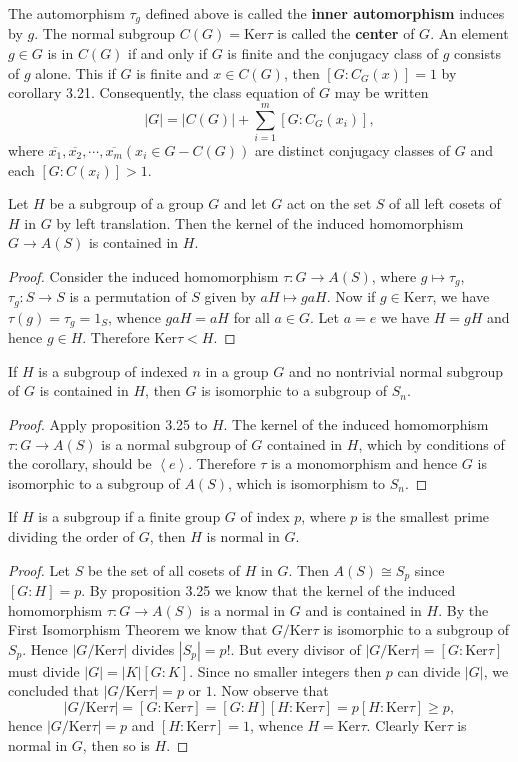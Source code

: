 The automorphism $\tau_g$ defined above is called the \textbf{inner automorphism} induces by $g$. The normal subgroup $C(G)=\mathrm{Ker}\tau$ is called the \textbf{center} of $G$. An element $g\in G$ is in $C(G)$ if and only if $G$ is finite and the conjugacy class of $g$ consists of $g$ alone. This if $G$ is finite and $x\in C(G)$, then $[G:C_G(x)]=1$ by corollary 3.21. Consequently, the class equation of $G$ may be written 
$$|G|=|C(G)|+\sum_{i=1}^m[G:C_G(x_i)],$$
where $\overline{x_1},\overline{x_2},\cdots,\overline{x_m}(x_i\in G-C(G))$ are distinct conjugacy classes of $G$ and each $[G:C(x_i)]>1$.
\begin{proposition}
Let $H$ be a subgroup of a group $G$ and let $G$ act on the set $S$ of all left cosets of $H$ in $G$ by left translation. Then the kernel of the induced homomorphism $G\to A(S)$ is contained in $H$.
\end{proposition}
\begin{proof}
Consider the induced homomorphism $\tau:G\to A(S)$, where $g\mapsto\tau_g$, $\tau_g:S\to S$ is a permutation of $S$ given by $aH\mapsto gaH$. Now if $g\in\mathrm{Ker}\tau$, we have $\tau(g)=\tau_g=1_S$, whence $gaH=aH$ for all $a\in G$. Let $a=e$ we have $H=gH$ and hence $g\in H$. Therefore $\mathrm{Ker}\tau<H$.
\end{proof}
\begin{corollary}
If $H$ is a subgroup of indexed $n$ in a group $G$ and no nontrivial normal subgroup of $G$ is contained in $H$, then $G$ is isomorphic to a subgroup of $S_n$.
\end{corollary}
\begin{proof}
Apply proposition 3.25 to $H$. The kernel of the induced homomorphism $\tau:G\to A(S)$ is a normal subgroup of $G$ contained in $H$, which by conditions of the corollary, should be $\left<e\right>$. Therefore $\tau$ is a monomorphism and hence $G$ is isomorphic to a subgroup of $A(S)$, which is isomorphism to $S_n$.
\end{proof}
\begin{corollary}
If $H$  is a subgroup if a finite group $G$ of index $p$, where $p$ is the smallest prime dividing the order of $G$, then $H$ is normal in $G$.
\end{corollary}
\begin{proof}
Let $S$ be the set of all cosets of $H$ in $G$. Then $A(S)\cong S_p$ since $[G:H]=p$. By proposition 3.25 we know that the kernel of the induced homomorphism $\tau:G\to A(S)$ is a normal in $G$ and is contained in $H$. By the First Isomorphism Theorem we know that $G/\mathrm{Ker}\tau$ is isomorphic to a subgroup of $S_p$. Hence $|G/\mathrm{Ker}\tau|$ divides $|S_p|=p!$. But every divisor of $|G/\mathrm{Ker}\tau|=[G:\mathrm{Ker}\tau]$ must divide $|G|=|K|[G:K]$. Since no smaller integers then $p$ can divide $|G|$, we concluded that $|G/\mathrm{Ker}\tau|=p$ or $1$. Now observe that 
$$
\left| G/\mathrm{Ker}\tau \right|=\left[ G:\mathrm{Ker}\tau \right] =\left[ G:H \right] \left[ H:\mathrm{Ker}\tau \right] =p\left[ H:\mathrm{Ker}\tau \right] \ge p,
$$
hence $|G/\mathrm{Ker}\tau|=p$ and $[H:\mathrm{Ker}\tau]=1$, whence $H=\mathrm{Ker}\tau$. Clearly $\mathrm{Ker}\tau$ is normal in $G$, then so is $H$.
\end{proof}
